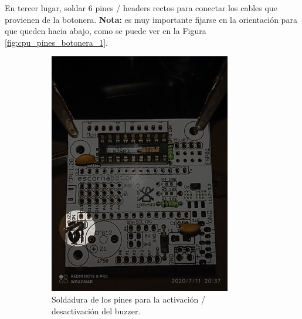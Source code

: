 \documentclass{article}
\begin{document}
En tercer lugar, soldar 6 pines / headers rectos para conectar los cables que provienen de la botonera. \textbf{Nota:} es muy importante fijarse en la orientación para que queden hacia abajo, como se puede ver en la Figura \ref{fig:cpu_pines_botonera_1}.

\begin{figure}[H]
    \centering
    \begin{subfigure}[t]{0.3\textwidth}
        \centering
        \includegraphics[width=0.9\columnwidth, height=1.2\columnwidth]{images/CPU/cpu_postes_buzzer_1.png}
        \caption{Soldadura de los pines para la activación / desactivación del buzzer.}
        \label{fig:cpu_pines_buzzer_1}
    \end{subfigure}%
    \begin{subfigure}[t]{0.3\textwidth}
        \centering

\end{subfigure}
\end{figure}
\end{document}
